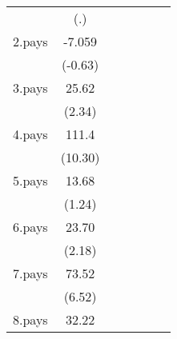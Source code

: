 {\begin{tabular}{l*{6}{c}}
                    &         (.)         &                     &                     &                     &                     &                     \\
[1em]
2.pays              &      -7.059         &                     &                     &                     &                     &                     \\
                    &     (-0.63)         &                     &                     &                     &                     &                     \\
[1em]
3.pays              &       25.62\sym{*}  &                     &                     &                     &                     &                     \\
                    &      (2.34)         &                     &                     &                     &                     &                     \\
[1em]
4.pays              &       111.4\sym{***}&                     &                     &                     &                     &                     \\
                    &     (10.30)         &                     &                     &                     &                     &                     \\
[1em]
5.pays              &       13.68         &                     &                     &                     &                     &                     \\
                    &      (1.24)         &                     &                     &                     &                     &                     \\
[1em]
6.pays              &       23.70\sym{*}  &                     &                     &                     &                     &                     \\
                    &      (2.18)         &                     &                     &                     &                     &                     \\
[1em]
7.pays              &       73.52\sym{***}&                     &                     &                     &                     &                     \\
                    &      (6.52)         &                     &                     &                     &                     &                     \\
[1em]
8.pays              &       32.22\sym{**} &                     &                     &                     &                     &                     \\

\end{tabular}}
